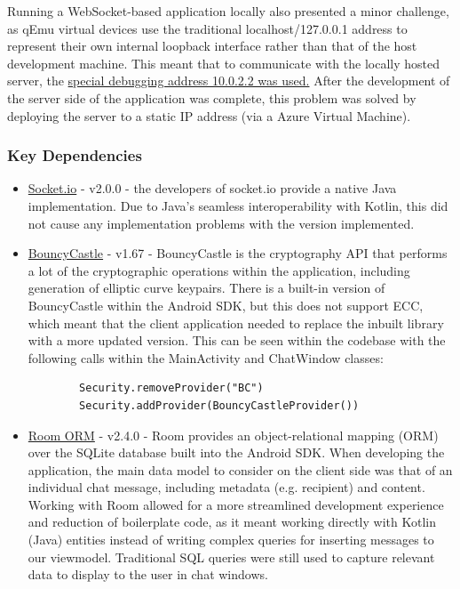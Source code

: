 \documentclass{mproj}
\begin{document}
Running a WebSocket-based application locally also presented a minor challenge, as qEmu virtual devices use the traditional localhost/127.0.0.1 address to represent their own internal loopback interface rather than that of the host development machine. This meant that to communicate with the locally hosted server, the \href{https://developer.android.com/studio/run/emulator-networking.html}{special debugging address 10.0.2.2 was used.} After the development of the server side of the application was complete, this problem was solved by deploying the server to a static IP address (via a Azure Virtual Machine).

\subsubsection{Key Dependencies}
\begin{itemize}
	\item \href{https://github.com/socketio/socket.io-client-java}{Socket.io} - v2.0.0 - the developers of socket.io provide a native Java implementation. Due to Java's seamless interoperability with Kotlin, this did not cause any implementation problems with the version implemented.
	\item \href{https://www.bouncycastle.org/}{BouncyCastle} - v1.67 - BouncyCastle is the cryptography API that performs a lot of the cryptographic operations within the application, including generation of elliptic curve keypairs. There is a built-in version of BouncyCastle within the Android SDK, but this does not support ECC, which meant that the client application needed to replace the inbuilt library with a more updated version. This can be seen within the codebase with the following calls within the MainActivity and ChatWindow classes:
		\begin{verbatim}
		Security.removeProvider("BC")
		Security.addProvider(BouncyCastleProvider())
		\end{verbatim}
	\item \href{https://developer.android.com/jetpack/androidx/releases/room}{Room ORM} - v2.4.0 - Room provides an object-relational mapping (ORM) over the SQLite database built into the Android SDK. When developing the application, the main data model to consider on the client side was that of an individual chat message, including metadata (e.g. recipient) and content. Working with Room allowed for a more streamlined development experience and reduction of boilerplate code, as it meant working directly with Kotlin (Java) entities instead of writing complex queries for inserting messages to our viewmodel. Traditional SQL queries were still used to capture relevant data to display to the user in chat windows. 
\end{itemize}
\end{document}
